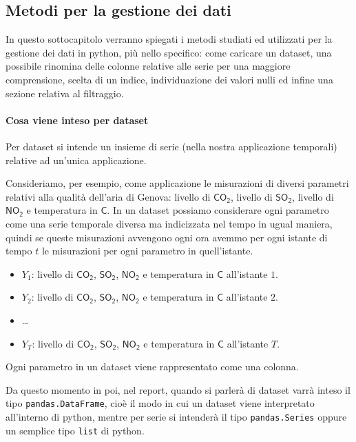 \subsection{Metodi per la gestione dei dati}
In questo sottocapitolo verranno spiegati i metodi studiati ed utilizzati per la gestione dei
dati in python, più nello specifico: come caricare un dataset, una possibile rinomina delle
colonne relative alle serie per una maggiore comprensione, scelta di un indice, individuazione dei valori
nulli ed infine una sezione relativa al filtraggio.

\paragraph{Cosa viene inteso per dataset} Per dataset si intende un insieme di
serie (nella nostra applicazione temporali) relative ad un'unica applicazione.

\begin{esempio}
    Consideriamo, per esempio, come applicazione le misurazioni di diversi parametri
    relativi alla qualità dell'aria di Genova: livello di $\mathsf{CO_2}$,
    livello di $\mathsf{SO_2}$, livello di $\mathsf{NO_2}$ e temperatura in \textdegree$\mathsf{C}$.
    In un dataset possiamo considerare ogni parametro come una serie temporale diversa ma indicizzata
    nel tempo in ugual maniera, quindi se queste misurazioni avvengono ogni ora avemmo
    per ogni istante di tempo $t$ le misurazioni per ogni parametro in quell'istante.
    \begin{itemize}
        \setlength\itemsep{-0.5em}
        \item $Y_1$: livello di $\mathsf{CO_2}$, $\mathsf{SO_2}$, $\mathsf{NO_2}$ e temperatura in \textdegree$\mathsf{C}$ all'istante $1$.
        \item $Y_2$: livello di $\mathsf{CO_2}$, $\mathsf{SO_2}$, $\mathsf{NO_2}$ e temperatura in \textdegree$\mathsf{C}$ all'istante $2$.
        \item \dots
        \item $Y_T$: livello di $\mathsf{CO_2}$, $\mathsf{SO_2}$, $\mathsf{NO_2}$ e temperatura in \textdegree$\mathsf{C}$ all'istante $T$.
    \end{itemize}
    Ogni parametro in un dataset viene rappresentato come una colonna.
\end{esempio}
Da questo momento in poi, nel report, quando si parlerà di dataset varrà inteso il tipo
\texttt{pandas.DataFrame}, cioè il modo in cui un dataset viene interpretato all'interno
di python, mentre per serie si intenderà il tipo \texttt{pandas.Series} oppure un semplice
tipo \texttt{list} di python.

